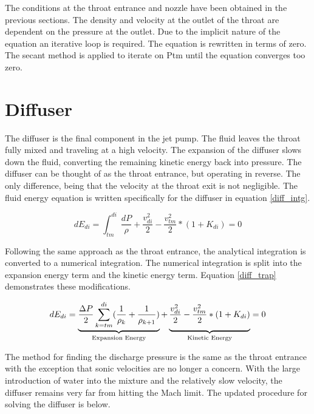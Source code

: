 \documentclass[12 pt]{report}
\begin{document}
The conditions at the throat entrance and nozzle have been obtained in the previous sections. The density and velocity at the outlet of the throat are dependent on the pressure at the outlet. Due to the implicit nature of the equation an iterative loop is required. The equation is rewritten in terms of zero. The secant method is applied to iterate on Ptm until the equation converges too zero.

\section{Diffuser} \label{diff_section}
The diffuser is the final component in the jet pump. The fluid leaves the throat fully mixed and traveling at a high velocity. The expansion of the diffuser slows down the fluid, converting the remaining kinetic energy back into pressure. The diffuser can be thought of as the throat entrance, but operating in reverse. The only difference, being that the velocity at the throat exit is not negligible. The fluid energy equation is written specifically for the diffuser in equation \eqref{diff_intg}.

\begin{equation}
dE_{di} = \int_{tm}^{di} \frac{dP}{\rho} + \frac{v_{di}^{2}}{2} - \frac{v_{tm}^{2}}{2} * (1+K_{di}) = 0
\label{diff_intg}
\end{equation}

Following the same approach as the throat entrance, the analytical integration is converted to a numerical integration. The numerical integration is split into the expansion energy term and the kinetic energy term. Equation \eqref{diff_trap} demonstrates these modifications.

\begin{equation}
dE_{di} = \underbrace{\frac{\Delta P}{2}\sum_{k=tm}^{di} (\frac{1}{\rho_{k}} + \frac{1}{\rho_{k+1}})}_{\text{Expansion Energy}} + \underbrace{\vphantom{\sum_{k=di}^{tm}}\frac{v_{di}^{2}}{2} - \frac{v_{tm}^{2}}{2} * (1+K_{di})}_{\text{Kinetic Energy}} = 0
\label{diff_trap}
\end{equation}

The method for finding the discharge pressure is the same as the throat entrance with the exception that sonic velocities are no longer a concern. With the large introduction of water into the mixture and the relatively slow velocity, the diffuser remains very far from hitting the Mach limit. The updated procedure for solving the diffuser is below.
\end{document}
